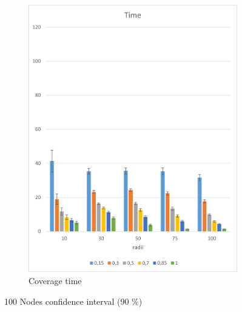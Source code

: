 \begin{figure}[H]
\begin{subfigure}{.5\textwidth}
  \includegraphics[width=1\linewidth]{./images/100endtimeCI.png}
  \caption{Coverage time}
  \label{fig:sub2}
\end{subfigure}
\caption{100 Nodes confidence interval (90 \%)}
\label{fig:test}
\end{figure}

